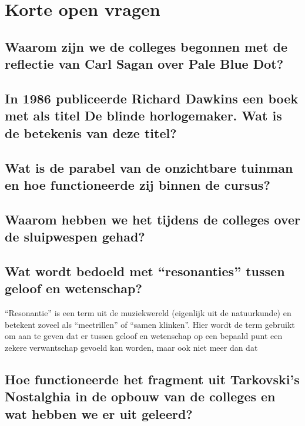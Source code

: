 \documentclass[11pt,a4paper,titlepage]{article}
\begin{document}
\section{Korte open vragen}
\subsection{Waarom zijn we de colleges begonnen met de reflectie van Carl Sagan over Pale Blue Dot?}
\subsection{In 1986 publiceerde Richard Dawkins een boek met als titel De blinde horlogemaker. Wat is
de betekenis van deze titel?}
\subsection{Wat is de parabel van de onzichtbare tuinman en hoe functioneerde zij binnen de cursus?}
\subsection{Waarom hebben we het tijdens de colleges over de sluipwespen gehad?}
\subsection{Wat wordt bedoeld met “resonanties” tussen geloof en wetenschap? }
 “Resonantie” is een term uit de muziekwereld (eigenlijk uit de natuurkunde) en betekent zoveel als
“meetrillen” of “samen klinken”. Hier wordt de term gebruikt om aan te
geven dat er tussen geloof en wetenschap op een bepaald punt een
zekere verwantschap gevoeld kan worden, maar ook niet meer dan dat
\subsection{Hoe functioneerde het fragment uit Tarkovski’s Nostalghia in de opbouw van de colleges en
wat hebben we er uit geleerd?}
\end{document}
